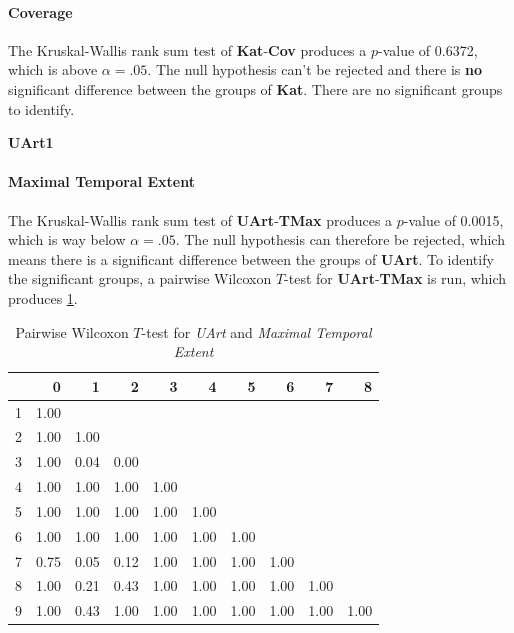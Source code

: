 \paragraph{Coverage}
The Kruskal-Wallis rank sum test of \textbf{Kat}-\textbf{Cov} produces a $p$-value of 0.6372, which is above $\alpha=.05$. The null hypothesis can't be rejected and there is \textbf{no} significant difference between the groups of \textbf{Kat}. There are no significant groups to identify.

\Large
\centerline{\textbf{UArt1}}
\normalsize

\paragraph{Maximal Temporal Extent}
The Kruskal-Wallis rank sum test of \textbf{UArt}-\textbf{TMax} produces a $p$-value of 0.0015, which is way below $\alpha=.05$. The null hypothesis can therefore be rejected, which means there is a significant difference between the groups of \textbf{UArt}. To identify the significant groups, a pairwise Wilcoxon $T$-test for \textbf{UArt}-\textbf{TMax} is run, which produces \cref{tbl:wilcoxon_baysis_initiator_UArt_TMax}. 
\begin{table}[ht]
	\small
	\centering
    \begin{tabular}{rrrrrrrrrr}
        \toprule
        & 0 & 1 & 2 & 3 & 4 & 5 & 6 & 7 & 8 \\ 
        \midrule
        1 & 1.00 &  &  &  &  &  &  &  &  \\ 
        2 & 1.00 & 1.00 &  &  &  &  &  &  &  \\ 
        3 & 1.00 & 0.04 & 0.00 &  &  &  &  &  &  \\ 
        4 & 1.00 & 1.00 & 1.00 & 1.00 &  &  &  &  &  \\ 
        5 & 1.00 & 1.00 & 1.00 & 1.00 & 1.00 &  &  &  &  \\ 
        6 & 1.00 & 1.00 & 1.00 & 1.00 & 1.00 & 1.00 &  &  &  \\ 
        7 & 0.75 & 0.05 & 0.12 & 1.00 & 1.00 & 1.00 & 1.00 &  &  \\ 
        8 & 1.00 & 0.21 & 0.43 & 1.00 & 1.00 & 1.00 & 1.00 & 1.00 &  \\ 
        9 & 1.00 & 0.43 & 1.00 & 1.00 & 1.00 & 1.00 & 1.00 & 1.00 & 1.00 \\ 
        \bottomrule
      \end{tabular}
    \caption{Pairwise Wilcoxon $T$-test for \textit{UArt} and \textit{Maximal Temporal Extent}}
    \label{tbl:wilcoxon_baysis_initiator_UArt_TMax}
\end{table}
